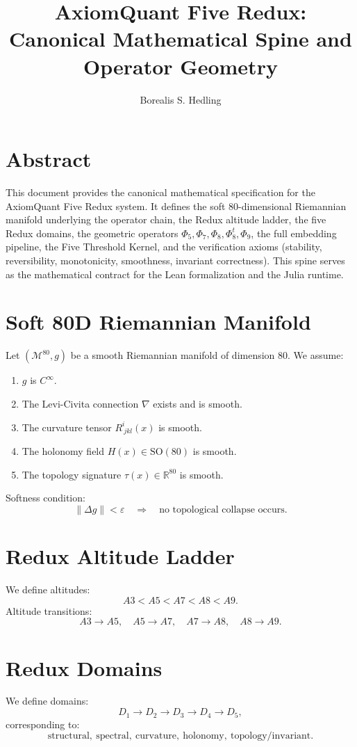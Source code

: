 \documentclass[11pt]{article}
\title{AxiomQuant Five Redux:\\
Canonical Mathematical Spine and Operator Geometry}
\author{Borealis S. Hedling}
\date{}
\begin{document}
\maketitle

\section*{Abstract}
This document provides the canonical mathematical specification for the
AxiomQuant Five Redux system. It defines the soft 80-dimensional Riemannian
manifold underlying the operator chain, the Redux altitude ladder, the five
Redux domains, the geometric operators $\Phi_5, \Phi_7, \Phi_8, \Phi_8^t,
\Phi_9$, the full embedding pipeline, the Five Threshold Kernel, and the
verification axioms (stability, reversibility, monotonicity, smoothness,
invariant correctness). This spine serves as the mathematical contract for the
Lean formalization and the Julia runtime.

\section{Soft 80D Riemannian Manifold}
Let $(\mathcal{M}^{80}, g)$ be a smooth Riemannian manifold of dimension $80$.
We assume:
\begin{enumerate}
    \item $g$ is $C^\infty$.
    \item The Levi-Civita connection $\nabla$ exists and is smooth.
    \item The curvature tensor $R^i_{\ jkl}(x)$ is smooth.
    \item The holonomy field $H(x) \in \mathrm{SO}(80)$ is smooth.
    \item The topology signature $\tau(x) \in \mathbb{R}^{80}$ is smooth.
\end{enumerate}

Softness condition:
\[
\| \Delta g \| < \varepsilon \quad \Rightarrow \quad
\text{no topological collapse occurs}.
\]

\section{Redux Altitude Ladder}
We define altitudes:
\[
A3 < A5 < A7 < A8 < A9.
\]
Altitude transitions:
\[
A3 \to A5,\quad A5 \to A7,\quad A7 \to A8,\quad A8 \to A9.
\]

\section{Redux Domains}
We define domains:
\[
D_1 \to D_2 \to D_3 \to D_4 \to D_5,
\]
corresponding to:
\[
\text{structural},\ \text{spectral},\ \text{curvature},\ 
\text{holonomy},\ \text{topology/invariant}.
\]
\end{document}
